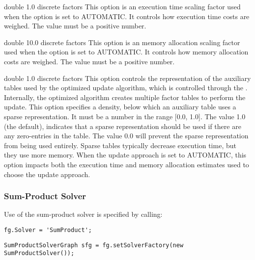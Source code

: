 
{double}
{1.0}
{discrete factors}
{This option is an execution time scaling factor used when the  option is set to AUTOMATIC. It controls how execution time costs are weighed. The value must be a positive number.}


{double}
{10.0}
{discrete factors}
{This option is an memory allocation scaling factor used when the  option is set to AUTOMATIC. It controls how memory allocation costs are weighed. The value must be a positive number.}


{double}
{1.0}
{discrete factors}
{This option controls the representation of the auxiliary tables used by the optimized update algorithm, which is controlled through the . Internally, the optimized algorithm creates multiple factor tables to perform the update. This option specifies a density, below which an auxiliary table uses a sparse representation. It must be a number in the range [0.0, 1.0]. The value 1.0 (the default), indicates that a sparse representation should be used if there are any zero-entries in the table. The value 0.0 will prevent the sparse representation from being used entirely. Sparse tables typically decrease execution time, but they use more memory. When the update approach is set to AUTOMATIC, this option impacts both the execution time and memory allocation estimates used to choose the update approach.}

\clearpage
\subsubsection{Sum-Product Solver}
\label{sec:SumProductSolver}

Use of the sum-product solver is specified by calling:

\ifmatlab
\begin{lstlisting}
fg.Solver = 'SumProduct';
\end{lstlisting}
\fi

\ifjava
\begin{lstlisting}
SumProductSolverGraph sfg = fg.setSolverFactory(new SumProductSolver());
\end{lstlisting}
\fi


